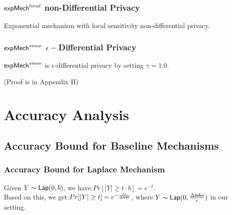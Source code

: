 \documentclass{article}
\begin{document}
\subsubsection{$\mathsf{expMech}^{local}$ non-Differential Privacy}
Exponential mechanism with local sensitivity non-differential privacy.

\subsubsection{$\mathsf{expMech}^{smoo}$ $\epsilon-$Differential Privacy}

\begin{lem}
\label{lem_hexpmech_privacy}
$\mathsf{expMech}^{smoo}$ is $\epsilon$-differential privacy by setting $\gamma = 1.0$.
\end{lem}
(Proof is in Appendix II)



\section{Accuracy Analysis}

\subsection{Accuracy Bound for Baseline Mechanisms}



\subsubsection{Accuracy Bound for Laplace Mechanism}
\label{subsec_accuracy_lap}
Given $Y \thicksim \mathsf{Lap}(0, b)$, we have\cite{dwork2014algorithmic}:$Pr[|Y| \geq t \cdot b] = e^{- t}.$\\
Based on this, we get:$Pr[|Y| \geq t] = e^{- \frac{t \epsilon}{\Delta \mathsf{Infer}}}$, where $Y \thicksim \mathsf{Lap}(0, \frac{\Delta \mathsf{Infer}}{\epsilon})$ in our setting.
\end{document}
